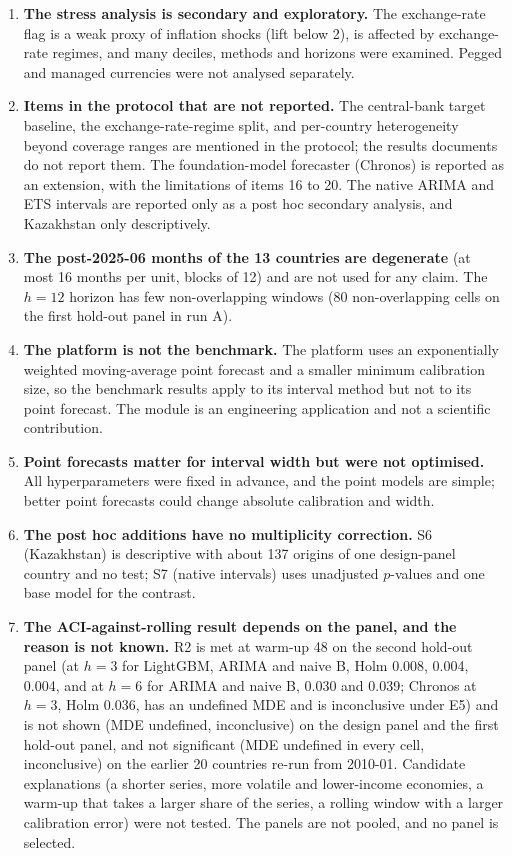 \begin{enumerate}
\item \textbf{The stress analysis is secondary and exploratory.} The exchange-rate flag is a weak proxy of inflation shocks (lift below 2), is affected by exchange-rate regimes, and many deciles, methods and horizons were examined. Pegged and managed currencies were not analysed separately.
\item \textbf{Items in the protocol that are not reported.} The central-bank target baseline, the exchange-rate-regime split, and per-country heterogeneity beyond coverage ranges are mentioned in the protocol; the results documents do not report them. The foundation-model forecaster (Chronos) is reported as an extension, with the limitations of items 16 to 20. The native ARIMA and ETS intervals are reported only as a post hoc secondary analysis, and Kazakhstan only descriptively.
\item \textbf{The post-2025-06 months of the 13 countries are degenerate} (at most 16 months per unit, blocks of 12) and are not used for any claim. The $h=12$ horizon has few non-overlapping windows (80 non-overlapping cells on the first hold-out panel in run A).
\item \textbf{The platform is not the benchmark.} The platform uses an exponentially weighted moving-average point forecast and a smaller minimum calibration size, so the benchmark results apply to its interval method but not to its point forecast. The module is an engineering application and not a scientific contribution.
\item \textbf{Point forecasts matter for interval width but were not optimised.} All hyperparameters were fixed in advance, and the point models are simple; better point forecasts could change absolute calibration and width.
\item \textbf{The post hoc additions have no multiplicity correction.} S6 (Kazakhstan) is descriptive with about 137 origins of one design-panel country and no test; S7 (native intervals) uses unadjusted $p$-values and one base model for the contrast.
\item \textbf{The ACI-against-rolling result depends on the panel, and the reason is not known.} R2 is met at warm-up 48 on the second hold-out panel (at $h=3$ for LightGBM, ARIMA and naive B, Holm 0.008, 0.004, 0.004, and at $h=6$ for ARIMA and naive B, 0.030 and 0.039; Chronos at $h=3$, Holm 0.036, has an undefined MDE and is inconclusive under E5) and is not shown (MDE undefined, inconclusive) on the design panel and the first hold-out panel, and not significant (MDE undefined in every cell, inconclusive) on the earlier 20 countries re-run from 2010-01. Candidate explanations (a shorter series, more volatile and lower-income economies, a warm-up that takes a larger share of the series, a rolling window with a larger calibration error) were not tested. The panels are not pooled, and no panel is selected.

\end{enumerate}
